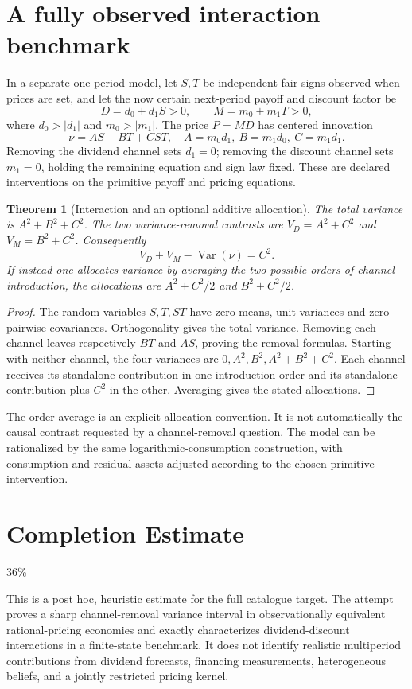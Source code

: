 \documentclass[11pt,a4paper]{article}
\newtheorem{theorem}{Theorem}[section]
\theoremstyle{definition}
\theoremstyle{remark}
\DeclareMathOperator{\Var}{Var}
\begin{document}
\section{A fully observed interaction benchmark}
In a separate one-period model, let $S,T$ be independent fair signs observed when prices are set, and let the now certain next-period payoff and discount factor be
\[
 D=d_0+d_1S>0,\qquad M=m_0+m_1T>0,
\]
where $d_0>|d_1|$ and $m_0>|m_1|$. The price $P=MD$ has centered innovation
\[
 \nu=A S+B T+C ST,\quad A=m_0d_1,\ B=m_1d_0,\ C=m_1d_1.
\]
Removing the dividend channel sets $d_1=0$; removing the discount channel sets $m_1=0$, holding the remaining equation and sign law fixed. These are declared interventions on the primitive payoff and pricing equations.

\begin{theorem}[Interaction and an optional additive allocation]
The total variance is $A^2+B^2+C^2$. The two variance-removal contrasts are $V_D=A^2+C^2$ and $V_M=B^2+C^2$. Consequently
\[
 V_D+V_M-\Var(\nu)=C^2.
\]
If instead one allocates variance by averaging the two possible orders of channel introduction, the allocations are $A^2+C^2/2$ and $B^2+C^2/2$.
\end{theorem}
\begin{proof}
The random variables $S,T,ST$ have zero means, unit variances and zero pairwise covariances. Orthogonality gives the total variance. Removing each channel leaves respectively $BT$ and $AS$, proving the removal formulas. Starting with neither channel, the four variances are $0,A^2,B^2,A^2+B^2+C^2$. Each channel receives its standalone contribution in one introduction order and its standalone contribution plus $C^2$ in the other. Averaging gives the stated allocations.
\end{proof}

The order average is an explicit allocation convention. It is not automatically the causal contrast requested by a channel-removal question. The model can be rationalized by the same logarithmic-consumption construction, with consumption and residual assets adjusted according to the chosen primitive intervention.

\section{Completion Estimate}
36\%

This is a post hoc, heuristic estimate for the full catalogue target.
The attempt proves a sharp channel-removal variance interval in observationally equivalent rational-pricing economies and exactly characterizes dividend-discount interactions in a finite-state benchmark. It does not identify realistic multiperiod contributions from dividend forecasts, financing measurements, heterogeneous beliefs, and a jointly restricted pricing kernel.
\end{document}
